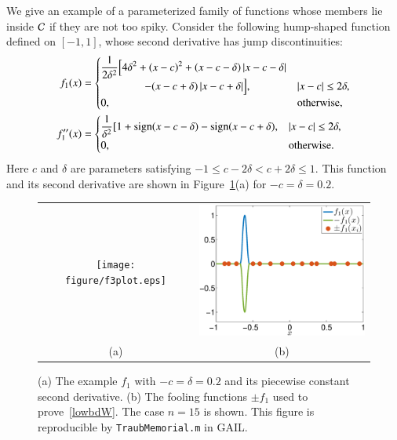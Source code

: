 \documentclass[review]{elsarticle}
\theoremstyle{definition}
\begin{document}
We give an example of a parameterized family of functions whose members lie
inside $\mathcal{C}$ if they are not too spiky. 
Consider the following hump-shaped function defined on $[-1,1]$, whose
second derivative has jump discontinuities:
\begin{align} \label{f3def}
f_1(x) & = \begin{cases} \displaystyle
   \frac{1}{2\delta^2} \Bigl [4 \delta^2 + (x-c)^2 + (x-c-\delta)\left \lvert x-c-\delta \right \rvert
\\ \qquad \qquad
    - (x-c+\delta)\left \lvert x-c+\delta \right \rvert \Bigr ], & \left \lvert x-c \right \rvert \le 2\delta,
\\ 0, & \text{otherwise},
\end{cases} 
\\ \nonumber
f''_1(x) & =
\begin{cases} \displaystyle
    \frac{1}{\delta^2} [1 + \operatorname{sign}(x-c-\delta) - \operatorname{sign}(x-c+\delta), & \left \lvert x-c \right \rvert \le 2\delta,
\\ 0, & \text{otherwise}.
\end{cases}
\end{align}
Here $c$ and $\delta$ are parameters satisfying $-1 \le c-2 \delta < c+ 2\delta
\le 1$. This function and its second derivative are shown in Figure~\ref{f3fig}(a)
for $-c=\delta = 0.2$.


\begin{figure}[tb]
\centering
\begin{tabular}{cc}
\texttt{[image: figure/f3plot.eps]}  
& \includegraphics[width=5.7cm]{figure/f3foolplot.eps}
\\[1ex] (a) & (b)
\end{tabular}
\caption{(a) The example $f_1$ with $-c=\delta = 0.2$ and its piecewise constant
second derivative. %
(b) The fooling functions $\pm f_1$ used to prove~\eqref{lowbdW}. The case
$n=15$ is shown.  
This figure is reproducible by {\tt TraubMemorial.m} in GAIL.}
\label{f3fig}
\end{figure}
\end{document}
